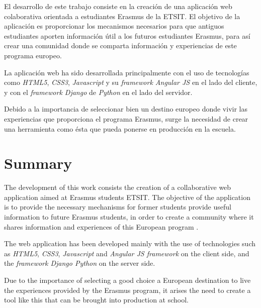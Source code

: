 \documentclass[a4paper, 12pt]{book}
\begin{document}
El desarrollo de este trabajo consiste en la creación de una aplicación web colaborativa orientada a estudiantes Erasmus de la ETSIT. El objetivo de la aplicación es proporcionar los mecanismos necesarios para que antiguos estudiantes aporten información útil a los futuros estudiantes Erasmus, para así crear una comunidad donde se comparta información y experiencias de este programa europeo.
\newline

La aplicación web ha sido desarrollada principalmente con el uso de tecnologías como \textit{HTML5}, \textit{CSS3}, \textit{Javascript} y su \textit{framework Angular JS} en el lado del cliente, y con el \textit{framework Django} de \textit{Python} en el lado del servidor.  
\newline

Debido a la importancia de seleccionar bien un destino europeo donde vivir las experiencias que proporciona el programa Erasmus, surge la necesidad de crear una herramienta como ésta que pueda ponerse en producción en la escuela.




\chapter*{Summary}

The development of this work consists the creation of a collaborative web application aimed at Erasmus students ETSIT. The objective of the application is to provide the necessary mechanisms for former students provide useful information to future Erasmus students, in order to create a community where it shares information and experiences of this European program .
\newline

The web application has been developed mainly with the use of technologies such as \textit{HTML5}, \textit{CSS3}, \textit{Javascript} and \textit{Angular JS framework} on the client side, and the \textit{framework Django Python} on the server side.
\newline

Due to the importance of selecting a good choice a European destination to live the experiences provided by the Erasmus program, it arises the need to create a tool like this that can be brought into production at school.
\end{document}
